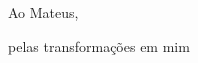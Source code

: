 \newpage

\vspace*{\fill}

{\large \hfill Ao Mateus,}

{\large \hfill pelas transformações em mim}


